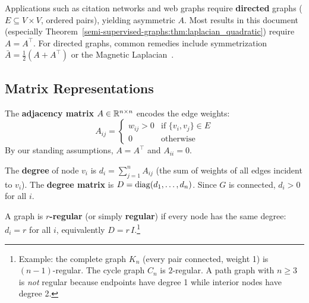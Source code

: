 \begin{notechapter}
\begin{remark}
\label{semi-supervised-graphs:rem:directed}
Applications such as citation networks and web graphs require \textbf{directed}
graphs ($E \subseteq V \times V$, ordered pairs), yielding asymmetric $A$.
Most results in this document (especially Theorem~\ref{semi-supervised-graphs:thm:laplacian_quadratic})
require $A = A^\top$. For directed graphs, common remedies include
symmetrization $\bar{A} = \frac{1}{2}(A + A^\top)$ or the Magnetic
Laplacian~\cite{semi-supervised-graphs:zhang2021magnet}.
\end{remark}

\subsection{Matrix Representations}

\begin{definition}
\label{semi-supervised-graphs:def:adjacency}
The \textbf{adjacency matrix} $A \in \mathbb{R}^{n \times n}$ encodes the edge weights:
\begin{equation}
A_{ij} = \begin{cases} w_{ij} > 0 & \text{if } \{v_i, v_j\} \in E \\
0 & \text{otherwise} \end{cases}
\end{equation}
By our standing assumptions, $A = A^\top$ and $A_{ii} = 0$.
\end{definition}

\begin{definition}
\label{semi-supervised-graphs:def:degree}
The \textbf{degree} of node $v_i$ is $d_i = \sum_{j=1}^n A_{ij}$ (the sum of
weights of all edges incident to $v_i$). The \textbf{degree matrix} is
$D = \operatorname{diag}(d_1, \ldots, d_n)$. Since $G$ is connected, $d_i > 0$ for all $i$.
\end{definition}

\begin{definition}
\label{semi-supervised-graphs:def:regular}
A graph is \textbf{$r$-regular} (or simply \textbf{regular}) if every node has
the same degree: $d_i = r$ for all $i$, equivalently $D = r\,I$.\footnote{
Example: the complete graph $K_n$ (every pair connected, weight 1) is
$(n{-}1)$-regular. The cycle graph $C_n$ is $2$-regular. A path graph with
$n \geq 3$ is \emph{not} regular because endpoints have degree 1 while
interior nodes have degree 2.}
\end{definition}


\end{notechapter}
